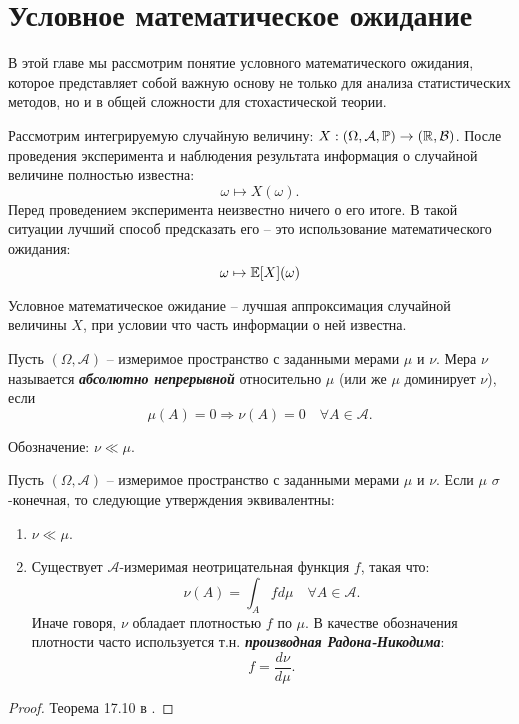 \chapter{Условное математическое ожидание}

В этой главе мы рассмотрим понятие условного математического ожидания, которое представляет собой важную основу не только для анализа статистических методов, но и в общей сложности для стохастической теории.

\begin{rmrk} Рассмотрим интегрируемую случайную величину: $ X: (\Omega, \mathcal{A}, \mathbb{P}) \rightarrow (\mathbb{R}, \mathcal{B})$. После проведения эксперимента и наблюдения результата информация о случайной величине полностью известна:
	\[ \omega \mapsto X(\omega). \]
	Перед проведением эксперимента неизвестно ничего о его итоге. В такой ситуации лучший способ предсказать его -- это использование математического ожидания:
	\[ 	\omega \mapsto \mathbb{E}[X](\omega) \]
	
	Условное математическое ожидание -- лучшая аппроксимация случайной величины $X$, при условии что часть информации о ней известна.
	\end{rmrk}

\begin{defn} Пусть $(\Omega, \mathcal{A})$ -- измеримое пространство с заданными мерами $\mu$ и $\nu$. Мера $\nu$ называется  \textbf{\textit{абсолютно непрерывной}} относительно $\mu$ (или же $\mu$ доминирует $\nu$), если
	\[\mu(A) = 0 \Longrightarrow \nu(A)=0 \quad \forall A \in \mathcal{A}.\]
	
	Обозначение: $\nu \ll \mu$.
\end{defn}


\begin{thm} \label{Radon Nikodym}
	 Пусть $(\Omega, \mathcal{A})$ -- измеримое пространство с заданными мерами $\mu$ и $\nu$. Если $\mu$ $\sigma$-конечная, то следующие утверждения эквивалентны:
	\begin{enumerate}
		\item $\nu \ll \mu$.
		\item Существует $\mathcal{A}$-измеримая неотрицательная функция $f$, такая что:
		\[\nu(A)=\int_{A} f d\mu \quad \forall A \in \mathcal{A}.\]
		Иначе говоря, $\nu$ обладает плотностью $f$ по $\mu$. В качестве обозначения плотности часто используется т.н. \textbf{\textit{производная Радона-Никодима}}:
		\[ f=\frac{d\nu}{d\mu}. \]
    \end{enumerate}
	\end{thm}
\begin{proof}
	Теорема 17.10 в \cite{Bauer}.
\end{proof}

